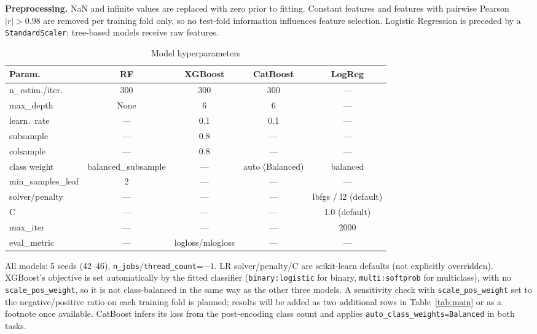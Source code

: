 \documentclass[conference]{IEEEtran}
\begin{document}
\textbf{Preprocessing.} NaN and infinite values are replaced with zero prior to fitting. Constant features
and features with pairwise Pearson $|r|>0.98$ are removed per training fold only, so no test-fold
information influences feature selection. Logistic Regression is preceded by a \texttt{StandardScaler};
tree-based models receive raw features.

\begin{table}[t]
\caption{Model hyperparameters}
\label{tab:hparams}
\centering
\scriptsize
\setlength{\tabcolsep}{3pt}
\begin{tabular}{lcccc}
\toprule
Param. & RF & XGBoost & CatBoost & LogReg \\
\midrule
n\_estim./iter.   & 300 & 300 & 300 & --- \\
max\_depth        & None & 6 & 6 & --- \\
learn.\ rate      & --- & 0.1 & 0.1 & --- \\
subsample         & --- & 0.8 & --- & --- \\
colsample         & --- & 0.8 & --- & --- \\
class weight      & balanced\_subsample & --- & auto (Balanced) & balanced \\
min\_samples\_leaf& 2   & --- & --- & --- \\
solver/penalty    & --- & --- & --- & lbfgs / l2 (default) \\
C                 & --- & --- & --- & 1.0 (default) \\
max\_iter         & --- & --- & --- & 2000 \\
eval\_metric      & --- & logloss/mlogloss & --- & --- \\
\bottomrule
\end{tabular}

\vspace{2pt}
\raggedright\footnotesize All models: 5 seeds (42--46), \texttt{n\_jobs}/\texttt{thread\_count}=$-1$.
LR solver/penalty/C are scikit-learn defaults (not explicitly overridden). XGBoost's objective is set
automatically by the fitted classifier (\texttt{binary:logistic} for binary, \texttt{multi:softprob} for
multiclass), with no \texttt{scale\_pos\_weight}, so it is not class-balanced in the same way as the other
three models. A sensitivity check with \texttt{scale\_pos\_weight} set to the negative/positive ratio on
each training fold is planned; results will be added as two additional rows in Table~\ref{tab:main} or
as a footnote once available. CatBoost infers its loss from the post-encoding class count and applies
\texttt{auto\_class\_weights=Balanced} in both tasks.
\end{table}
\end{document}
